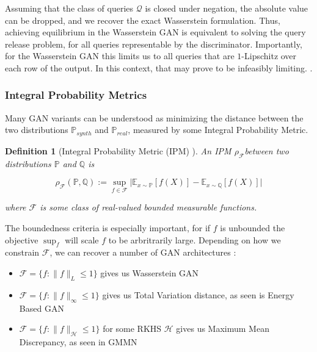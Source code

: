 \documentclass[]{article}
\newcommand{\Q}{\mathcal{Q}}
\newcommand{\F}{\mathcal{F}}
\newcommand{\p}{\mathbb{P}}
\newtheorem{definition}{Definition}[section]
\theoremstyle{definition}
\begin{document}
Assuming that the class of queries $\Q$ is closed under negation, the absolute value can be dropped, and we recover the exact Wasserstein formulation. Thus, achieving equilibrium in the Wasserstein GAN is equivalent to solving the query release problem, for all queries representable by the discriminator. Importantly, for the Wasserstein GAN this limits us to all queries that are $1$-Lipschitz over each row of the output. In this context, that may prove to be infeasibly limiting. .


\subsubsection{Integral Probability Metrics}

Many GAN variants can be understood as minimizing the distance between the two distributions $\p_{synth}$ and $\p_{real}$, measured by some Integral Probability Metric.

\begin{definition}[Integral Probability Metric (IPM) \cite{Mul97}]
    An IPM $\rho_\F$between two distributions $\mathbb{P}$ and $\mathbb{Q}$ is 

    \begin{equation}
        \rho_\F(\mathbb{P}, \mathbb{Q})  := \sup_{f \in \mathcal{F}} \big| \mathbb{E}_{x \sim \p}[f(X)] - \mathbb{E}_{x \sim \mathbb{Q}}[f(X)] \big|
    \end{equation}

    where $\F$ is some class of real-valued bounded measurable functions.
\end{definition}

The boundedness criteria is especially important, for if $f$ is unbounded the objective $\sup_f$ will scale $f$ to be arbritrarily large. Depending on how we constrain $\mathcal{F}$, we can recover a number of GAN architectures \cite{zotero-1283}: 

\begin{itemize}
    \item $\F = \{f: \|f\|_L \leq 1\}$ gives us Wasserstein GAN \cite{ACB17}
    \item $\F = \{f: \|f\|_\infty \leq 1 \}$ gives us Total Variation distance, as seen is Energy Based GAN \cite{ZML17}
    \item $\F = \{f: \|f\|_\mathcal{H} \leq 1 \}$ for some RKHS $\mathcal{H}$  gives us Maximum Mean Discrepancy, as seen in GMMN \cite{LSZ15a}
\end{itemize}
\end{document}

